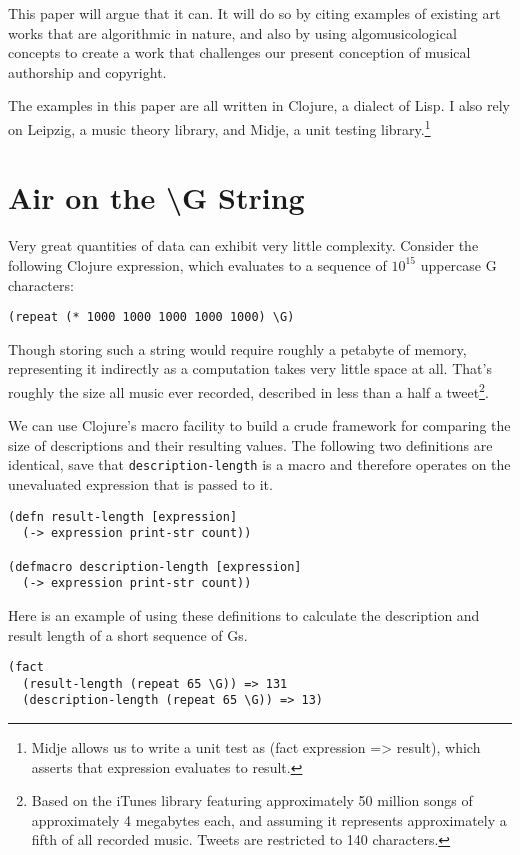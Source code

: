 \documentclass[numbers]{sigplanconf}
\begin{document}
This paper will argue that it can. It will do so by citing examples of existing art works that are algorithmic in nature, and
also by using algomusicological concepts to create a work that challenges our present conception of musical authorship and
copyright.

The examples in this paper are all written in Clojure, a dialect of Lisp. I also rely on Leipzig, a music theory library,
and Midje, a unit testing library.\footnote{Midje allows us to write a unit test as (fact expression => result),
which asserts that expression evaluates to result.}

\section{Air on the {\textbackslash}G String}
Very great quantities of data can exhibit very little complexity. Consider the following Clojure expression, which
evaluates to a sequence of $10^{15}$ uppercase G characters:

\begin{verbatim}
(repeat (* 1000 1000 1000 1000 1000) \G)
\end{verbatim}

Though storing such a string would require roughly a petabyte of memory, representing it indirectly as a computation
takes very little space at all. That's roughly the size all music ever recorded,
described in less than a half a tweet\footnote{Based on the iTunes library featuring approximately 50 million songs
of approximately 4 megabytes each, and assuming it represents approximately a fifth of all recorded music. Tweets are
restricted to 140 characters.}.

We can use Clojure's macro facility to build a crude framework for comparing the size of descriptions and their
resulting values. The following two definitions are identical, save that \verb|description-length| is a macro and therefore
operates on the unevaluated expression that is passed to it.

\begin{verbatim}
(defn result-length [expression]
  (-> expression print-str count))

(defmacro description-length [expression]
  (-> expression print-str count))
\end{verbatim}

Here is an example of using these definitions to calculate the description and result length of a short sequence of Gs.

\begin{verbatim}
(fact
  (result-length (repeat 65 \G)) => 131
  (description-length (repeat 65 \G)) => 13)
\end{verbatim}
\end{document}
